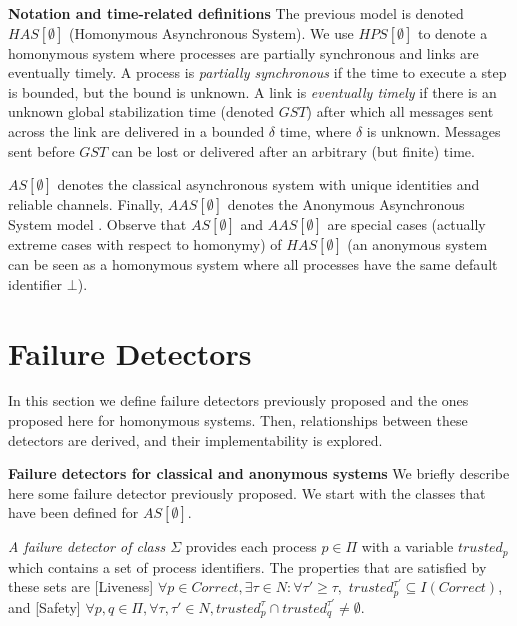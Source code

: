\documentclass[10pt, conference, compsocconf]{IEEEtran}
\newcommand{\tightparagraph}[1]{\smallskip \noindent \textbf{#1} \hspace{1ex}}
\newcommand{\C}{{\mathit{Correct}}}
\begin{document}
\tightparagraph{Notation and  time-related definitions}
The  previous  model is  denoted $\mathit{HAS}[\emptyset]$  (Homonymous
Asynchronous System). 
We  use  $\mathit{HPS}[\emptyset]$  to  denote a  homonymous  system  where
processes  are partially  synchronous and  links are  eventually  timely. 
A
process is  \emph{partially synchronous} if the  time to execute  a step is
bounded, but  the bound is unknown.  A link is  \emph{eventually timely} if
there  is  an unknown  global  stabilization  time  (denoted $GST$)
 after  which  all
messages sent  across the  link are delivered  in a bounded  $\delta$ time,
where  $\delta$ is  unknown.  Messages sent  before  $GST$ can  be lost  or
delivered after an arbitrary (but finite) time. 

$AS[\emptyset]$ denotes the  classical asynchronous  system with
unique identities  and  reliable channels. Finally, $AAS[\emptyset]$ denotes
the  Anonymous  Asynchronous   System model  \cite{DBLP:conf/wdag/BonnetR10}.  
Observe  that  $AS[\emptyset]$  and $AAS[\emptyset]$  are  special  cases
(actually extreme cases with respect to homonymy) of 
$\mathit{HAS}[\emptyset]$ (an anonymous system can be seen 
as a homonymous system where
all  processes  have the  same default identifier $\bot$).


\section{Failure Detectors}
\label{sec:FDs-defintions}

In this section we define failure detectors previously proposed and the 
ones proposed here for homonymous systems. Then, relationships between 
these detectors are derived, and their implementability is explored.

\tightparagraph{Failure detectors for classical and anonymous systems}
We briefly describe here some failure detector previously proposed. 
We start with the classes that have been defined for $AS[\emptyset]$.

\emph{A failure detector of class $\Sigma$} 
\cite{DBLP:journals/jacm/Delporte-GalletFG10} 
provides each process  
$p \in \Pi$ with a variable $trusted_p$ which contains a set of process 
identifiers. The properties that are satisfied by these sets are 
[Liveness] $\forall p \in \C , \exists \tau \in N: 
\forall \tau' \ge \tau , $ $trusted_p^{\tau'} \subseteq I(\C)$, and
[Safety] $\forall p, q \in \Pi, \forall \tau, \tau' \in N,
 trusted_p^{\tau} \cap trusted_q^{\tau'} \not=\emptyset$.
 
\end{document}
